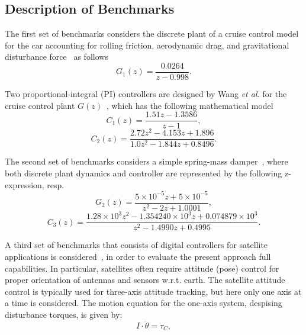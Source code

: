 \documentclass{sig-alternate-05-2015}
\begin{document}
\subsection{Description of Benchmarks}
\label{experimental-setup}

The first set of benchmarks considers the discrete plant of a cruise 
control model for the car accounting for rolling friction, aerodynamic drag, 
and gravitational disturbance force~\cite{Astrom08} as follows
%
\begin{equation}
\label{cruise-control-c1}
G_1(z)=\frac{0.0264}{z-0.998}. \nonumber
\end{equation} 

Two proportional-integral (PI) controllers are designed by Wang {\it et al.} 
for the cruise control plant $G(z)$~\cite{DBLP:conf/hybrid/WangGRJF16}, 
which has the following mathematical model
%
\begin{equation}
\label{cruise-control-g1}
C_{1}(z)=\frac{1.51z-1.3586}{z-1}, \nonumber
\end{equation} 
%
\begin{equation}
\label{cruise-control-g2}
C_{2}(z)=\frac{2.72z^2 - 4.153z + 1.896}{1.0z^2 - 1.844z + 0.8496}. \nonumber
\end{equation} 

The second set of benchmarks considers a simple spring-mass 
damper~\cite{DBLP:conf/hybrid/WangGRJF16}, where both discrete 
plant dynamics and controller are represented by the following 
z-expression, resp.
%
\begin{equation}
\label{spring-mass-damper-g}
G_2(z)=\frac{5\times{10^{-5}}z + 5\times{10^{-5}}}{z^2 - 2z + 1.0001}, \nonumber
\end{equation} 
%
\begin{equation}
\label{spring-mass-damper-c}
C_3(z)=\frac{1.28\times{10^{3}}z^2 - 1.354240\times{10^{3}}z + 0.074879\times{10^{3}}}{z^2 - 1.4990z + 0.4995}. \nonumber
\end{equation} 

A third set of benchmarks that consists of digital controllers for satellite
applications is considered~\cite{Franklin15}, in order to evaluate the
present approach full capabilities.  In particular, satellites often require
attitude (pose) control for proper orientation of antennas and sensors
w.r.t.  earth.  The satellite attitude control is typically used for
three-axis attitude tracking, but here only one axis at a time is
considered.  The motion equation for the one-axis system, despising
disturbance torques, is given by:
%
\begin{equation}
\label{eq:satelliteode}
I\cdot \ddot{\theta} = \tau_{C},
\end{equation}
\end{document}
